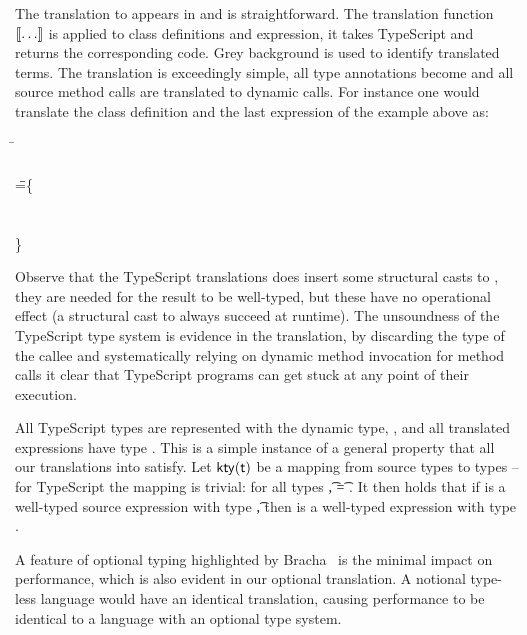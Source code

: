 \documentclass{tex/llncs}
\begin{document}
The translation to \kafka appears in  and is straightforward.
The translation function \(\TR{\dots}\) is applied to class definitions and
expression, it takes TypeScript and returns the corresponding \kafka
code. Grey background is used to identify translated terms. The translation
is exceedingly simple, all type annotations become \any and all source
method calls are translated to dynamic \kafka calls.  For instance one would
translate the class definition and the last expression of the example above as:

\medskip
{\small
\begin{tabbing}
  \hspace{.2cm}
   \= \DynCall{(\SubCast\any{\New\C{}})}\m{\DynCall{(\SubCast\any{\New\C{}})}\n{\New\C{}}} \\ \\ \HS\HS\HS\WHERE\HS \K\HS =\HS\= \class\= \C \{\\
   \>              \>\HS \Mdef\m\x\any\any{~\SubCast\any\this~} \\
   \>              \>\HS  \Mdef\mp\x\any\any{~\x~}\\
   \>                                                              \>  \}   
\end{tabbing}}
\medskip

\noindent
Observe that the TypeScript translations does insert some structural casts
to \any, they are needed for the result to be well-typed, but these have no
operational effect (a structural cast to \any always succeed at runtime).
The unsoundness of the TypeScript type system is evidence in the
translation, by discarding the type of the callee and systematically relying
on dynamic method invocation for method calls it clear that TypeScript
programs can get stuck at any point of their execution.


All TypeScript types are represented with the dynamic \kafka type, \any, and
all translated expressions have type \any.  This is a simple instance of a
general property that all our translations into \kafka satisfy.  Let
\(\kty\t\) be a mapping from source types to \kafka types -- for TypeScript
the mapping is trivial: for all types \t, \kty\t = \src{\any}.  It then
holds that if \e is a well-typed source expression with type \t, then
\TR{\e} is a well-typed \kafka expression with type \kty{\t}. 

A feature of optional typing highlighted by Bracha~\cite{pluggabletypes} 
is the minimal impact on performance, which is also evident in our optional translation.
A notional type-less language would have an identical translation, causing performance to
be identical to a language with an optional type system.
\end{document}
